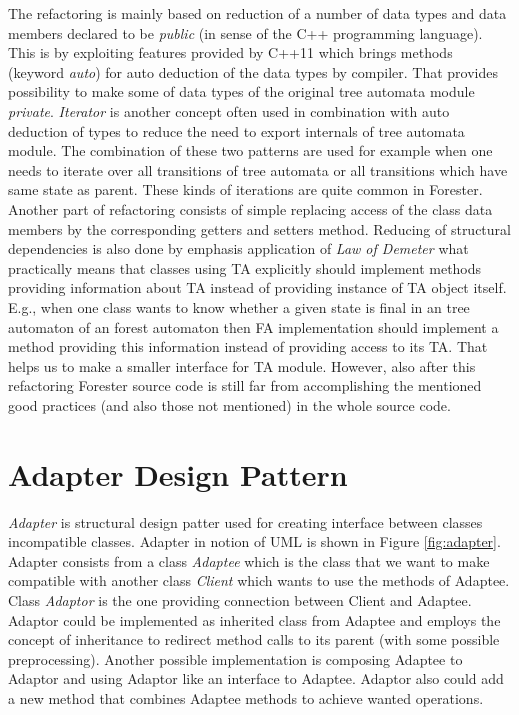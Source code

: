 The refactoring is mainly based on reduction of a number of data types and data members declared
to be \emph{public} (in sense of the C++ programming language).
This is by exploiting features provided by C++11 \cite{stroustrup13} which brings methods (keyword \emph{auto})
for auto deduction of the data types by compiler.
That provides possibility to make some of data types of the original tree automata module \emph{private}.
\emph{Iterator} is another concept often used in combination with auto deduction of types to reduce the need to export internals of tree automata module.
The combination of these two patterns are used for example when one needs to iterate over all transitions of tree automata or all transitions which
have same state as parent.
These kinds of iterations are quite common in Forester.
Another part of refactoring consists of simple replacing access of the class data members by the corresponding getters and setters method.
Reducing of structural dependencies is also done by emphasis application of \emph{Law of Demeter} \cite{lod89} what practically
means that classes using TA explicitly should implement methods providing information about TA instead of providing instance of TA object itself.
E.g., when one class wants to know whether a given state is final in an tree automaton of an forest automaton then FA implementation should
implement a method providing this information instead of providing access to its TA.
That helps us to make a smaller interface for TA module.
However, also after this refactoring Forester source code is still far from accomplishing the mentioned good practices (and also those not mentioned)
in the whole source code.

\section{Adapter Design Pattern}
\label{sec:adapter}

\emph{Adapter} is structural design patter \cite{gamma95} used for creating interface between classes incompatible classes.
Adapter in notion of UML is shown in Figure \ref{fig:adapter}.
Adapter consists from a class \emph{Adaptee} which is the class that we want to make compatible with
another class \emph{Client} which wants to use the methods of Adaptee.
Class \emph{Adaptor} is the one providing connection between Client and Adaptee.
Adaptor could be implemented as inherited class from Adaptee and employs the concept of inheritance to redirect
method calls to its parent (with some possible preprocessing).
Another possible implementation is composing Adaptee to Adaptor and using Adaptor like an interface to Adaptee.
Adaptor also could add a new method that combines Adaptee methods to achieve wanted operations.

